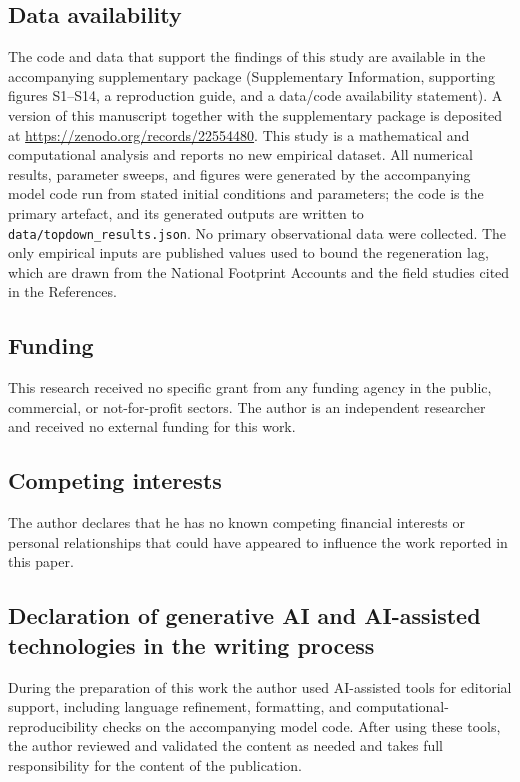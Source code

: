 \documentclass[11pt]{article}
\begin{document}
\subsection*{Data availability}
The code and data that support the findings of this study are available in the accompanying supplementary package (Supplementary Information, supporting figures S1--S14, a reproduction guide, and a data/code availability statement). A version of this manuscript together with the supplementary package is deposited at \url{https://zenodo.org/records/22554480}. This study is a mathematical and computational analysis and reports no new empirical dataset. All numerical results, parameter sweeps, and figures were generated by the accompanying model code run from stated initial conditions and parameters; the code is the primary artefact, and its generated outputs are written to \texttt{data/topdown\_results.json}. No primary observational data were collected. The only empirical inputs are published values used to bound the regeneration lag, which are drawn from the National Footprint Accounts and the field studies cited in the References.

\subsection*{Funding}
This research received no specific grant from any funding agency in the public, commercial, or not-for-profit sectors. The author is an independent researcher and received no external funding for this work.

\subsection*{Competing interests}
The author declares that he has no known competing financial interests or personal relationships that could have appeared to influence the work reported in this paper.

\subsection*{Declaration of generative AI and AI-assisted technologies in the writing process}
During the preparation of this work the author used AI-assisted tools for editorial support, including language refinement, formatting, and computational-reproducibility checks on the accompanying model code. After using these tools, the author reviewed and validated the content as needed and takes full responsibility for the content of the publication.
\end{document}
